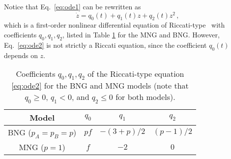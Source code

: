 \documentclass[review]{elsarticle}
\newcommand{\+}{\! + \!}
\begin{document}
Notice that Eq.~\eqref{eq:ode1} can be rewritten as 
%
\begin{equation}
    \label{eq:ode2}
    \dot{z} =  q_0( t ) + q_1( t ) z + q_2( t )  z^{2}   \, ,
\end{equation}
%
which is a first-order nonlinear differential equation of Riccati-type~\cite{ahmad2015, Jung2008} with coefficients  $q_0, q_1, q_2$, listed in Table \ref{table:table1} for the MNG and BNG.  
However, Eq.~\eqref{eq:ode2} is not strictly a Riccati equation, since the coefficient $q_0(t)$ depends on $z$.
%
\begin{table}
\renewcommand{\arraystretch}{2} 
\caption{Coefficients  $q_0, q_1, q_2$  of the Riccati-type equation \eqref{eq:ode2} for the BNG and MNG models 
    (note that $q_0 \ge 0$, $q_1 <  0$,  and $q_2 \le 0$ for both models).
}
\label{table:table1}
\begin{tabular}{c | c c c   }
Model & $q_0$ & $q_1$ &  $q_2$  \\ [1ex]
\hline
    BNG ($p_A=p_B=p$)   & $p f  $           & $-(3 + p)/2$          & $(p -1)/2$   \\
    MNG ($p=1$)         & $f$               & $- 2$                 & $ 0$    \\ 
\end{tabular}
\end{table}
%
\end{document}
